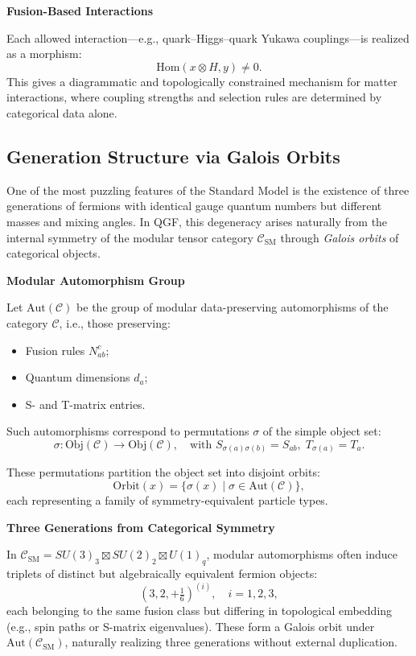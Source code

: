 \documentclass[11pt]{article}
\begin{document}
\vspace{0.8em}
\noindent\textbf{Fusion-Based Interactions}

Each allowed interaction—e.g., quark–Higgs–quark Yukawa couplings—is realized as a morphism:
\[
\text{Hom}(x \otimes H, y) \neq 0.
\]
This gives a diagrammatic and topologically constrained mechanism for matter interactions, where coupling strengths and selection rules are determined by categorical data alone.

\subsection{Generation Structure via Galois Orbits}

One of the most puzzling features of the Standard Model is the existence of three generations of fermions with identical gauge quantum numbers but different masses and mixing angles. In QGF, this degeneracy arises naturally from the internal symmetry of the modular tensor category \( \mathcal{C}_{\text{SM}} \) through \textit{Galois orbits} of categorical objects.

\vspace{0.5em}
\noindent\textbf{Modular Automorphism Group}

Let \( \text{Aut}(\mathcal{C}) \) be the group of modular data-preserving automorphisms of the category \( \mathcal{C} \), i.e., those preserving:
\begin{itemize}
  \item Fusion rules \( N_{ab}^c \);
  \item Quantum dimensions \( d_a \);
  \item S- and T-matrix entries.
\end{itemize}

Such automorphisms correspond to permutations \( \sigma \) of the simple object set:
\[
\sigma: \text{Obj}(\mathcal{C}) \rightarrow \text{Obj}(\mathcal{C}), \quad \text{with } S_{\sigma(a)\sigma(b)} = S_{ab}, \; T_{\sigma(a)} = T_a.
\]

These permutations partition the object set into disjoint orbits:
\[
\text{Orbit}(x) = \{ \sigma(x) \mid \sigma \in \text{Aut}(\mathcal{C}) \},
\]
each representing a family of symmetry-equivalent particle types.

\vspace{0.5em}
\noindent\textbf{Three Generations from Categorical Symmetry}

In \( \mathcal{C}_{\text{SM}} = SU(3)_3 \boxtimes SU(2)_2 \boxtimes U(1)_q \), modular automorphisms often induce triplets of distinct but algebraically equivalent fermion objects:
\[
(3,2,+\tfrac{1}{6})^{(i)}, \quad i = 1,2,3,
\]
each belonging to the same fusion class but differing in topological embedding (e.g., spin paths or S-matrix eigenvalues). These form a Galois orbit under \( \text{Aut}(\mathcal{C}_{\text{SM}}) \), naturally realizing three generations without external duplication.
\end{document}

